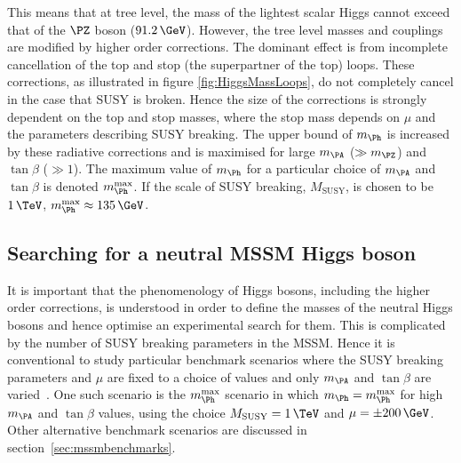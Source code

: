 This means that at tree level, the mass of the lightest scalar Higgs cannot
exceed that of the $\PZ$ boson ($91.2\,\GeV$). However, the tree level masses and
couplings are modified by higher order corrections. The dominant effect is from
incomplete cancellation of the top and stop (the superpartner of the top) loops.
These corrections, as illustrated in figure \ref{fig:HiggsMassLoops}, do not
completely cancel in the case that \ac{SUSY} is broken. Hence the size of the
corrections is strongly dependent on the top and stop masses, where the stop
mass depends on $\mu$ and the parameters describing \ac{SUSY} breaking. The upper
bound of $m_{\Ph}$ is increased by these radiative corrections and is maximised
for large $m_{\PA}$ ($\gg m_{\PZ}$) and $\tan\beta$ ($\gg1$). The maximum value of
$m_{\Ph}$ for a particular choice of $m_{\PA}$ and $\tan\beta$ is denoted
$m_{\Ph}^{\text{max}}$. If the scale of SUSY breaking, $M_{\text{SUSY}}$, is
chosen to be $1\,\TeV$, $m_{\Ph}^{\text{max}} \approx 135\,\GeV$.

\subsection{Searching for a neutral MSSM Higgs boson}
\label{sec:LHCMSSMHiggs}

It is important that the phenomenology of Higgs bosons, including the higher
order corrections, is understood in order to define the masses of the neutral
Higgs bosons and hence optimise an experimental search for them. This is
complicated by the number of \ac{SUSY} breaking parameters in the \ac{MSSM}. Hence it
is conventional to study particular benchmark scenarios where the \ac{SUSY} breaking
parameters and $\mu$ are fixed to a choice of values and only $m_{\PA}$ and
$\tan\beta$ are varied~\cite{Carena:2002es}. One such scenario is the $m_{\Ph}^{\text{max}}$ scenario
in which $m_{\Ph}=m_{\Ph}^{\text{max}}$ for high $m_{\PA}$ and $\tan\beta$
values, using the choice $M_{\text{SUSY}} = 1\,\TeV$ and $\mu = \pm 200\,\GeV$.
Other alternative benchmark scenarios are discussed in 
section~\ref{sec:mssmbenchmarks}. 

